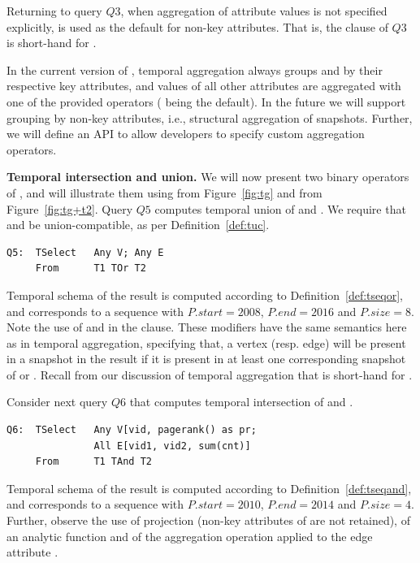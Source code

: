 Returning to query $Q3$, when aggregation of attribute values is not
specified explicitly,  is used as the default for non-key
attributes.  That is, the  clause of $Q3$ is short-hand
for  
.

In the current version of \ql, temporal aggregation always groups
 and  by their respective key attributes, and values
of all other attributes are aggregated with one of the provided
operators ( being the default).  In the future we will
support grouping by non-key attributes, i.e., structural aggregation
of snapshots.  Further, we will define an API to allow developers to
specify custom aggregation operators.

{\bf Temporal intersection and union.} We will now present two binary
operators of \ql, and will illustrate them using  from
Figure~\ref{fig:tg} and  from Figure~\ref{fig:tg+t2}.  Query
$Q5$ computes temporal union of  and .  We require
that  and  be union-compatible, as per
Definition~\ref{def:tuc}.

\begin{verbatim}
Q5:  TSelect   Any V; Any E
     From      T1 TOr T2
\end{verbatim}

Temporal schema of the result is computed according to
Definition~\ref{def:tseqor}, and corresponds to a sequence with
$P.start = 2008$, $P.end=2016$ and $P.size=8$.  Note the use of
 and  in the  clause.  These
modifiers have the same semantics here as in temporal aggregation,
specifying that, a vertex (resp. edge) will be present in a snapshot
in the result if it is present in at least one corresponding snapshot
of  or .  Recall from our discussion of temporal
aggregation that  is short-hand for
.

Consider next query $Q6$ that computes temporal intersection of
 and .

\begin{verbatim}
Q6:  TSelect   Any V[vid, pagerank() as pr; 
               All E[vid1, vid2, sum(cnt)]
     From      T1 TAnd T2
\end{verbatim}

Temporal schema of the result is computed according to
Definition~\ref{def:tseqand}, and corresponds to a sequence with
$P.start = 2010$, $P.end=2014$ and $P.size=4$.  Further, observe the
use of projection (non-key attributes of  are not retained),
of an analytic function  and of the aggregation
operation  applied to the edge attribute .  

